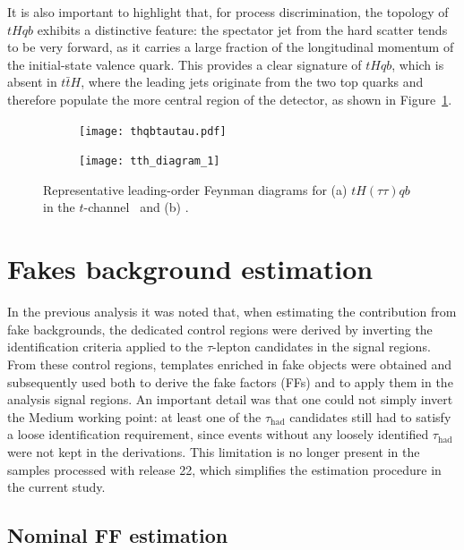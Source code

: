 It is also important to highlight that, for process discrimination, the topology of $tHqb$ exhibits a distinctive feature: the spectator jet from the hard scatter tends to be very forward, as it carries a large fraction of the longitudinal momentum of the initial-state valence quark. This provides a clear signature of $tHqb$, which is absent in $t\bar{t}H$, where the leading jets originate from the two top quarks and therefore populate the more central region of the detector, as shown in Figure~\ref{fig:feynman_tH_ttH}.
\begin{figure}[htbp]
    \centering
    \begin{subfigure}[b]{0.37\textwidth}
      \centering
      \texttt{[image: thqbtautau.pdf]}
      \caption{}
    \end{subfigure}
    \begin{subfigure}[b]{0.4\textwidth}
      \centering
      \texttt{[image: tth\_diagram\_1]}
      \caption{}
    \end{subfigure}
    \caption{Representative leading-order Feynman diagrams for (a) $tH(\tau\tau)qb$ in the $t$-channel~\cite{Barger_2010} and (b) \ttHtt.}
    \label{fig:feynman_tH_ttH}
  \end{figure}



\section{Fakes background estimation}
\label{fakes_run3}

In the previous analysis it was noted that, when estimating the contribution from fake backgrounds, the dedicated control regions were derived by inverting the identification criteria applied to the $\tau$-lepton candidates in the signal regions. From these control regions, templates enriched in fake objects were obtained and subsequently used both to derive the fake factors (FFs) and to apply them in the analysis signal regions. An important detail was that one could not simply invert the Medium working point: at least one of the $\tau_{\mathrm{had}}$ candidates still had to satisfy a loose identification requirement, since events without any loosely identified $\tau_{\mathrm{had}}$ were not kept in the derivations. This limitation is no longer present in the samples processed with release 22, which simplifies the estimation procedure in the current study.


\subsection{Nominal FF estimation}

